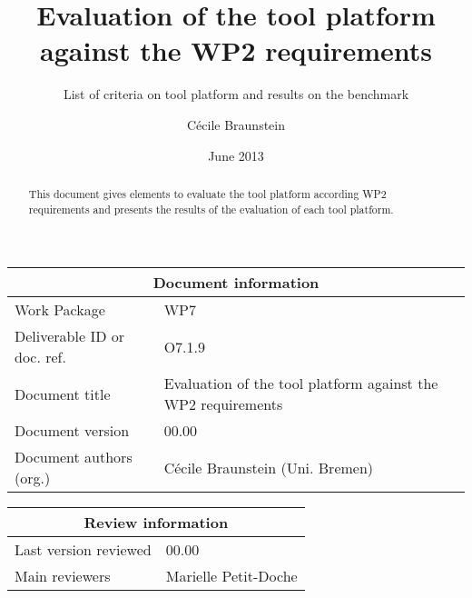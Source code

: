 \documentclass{openetcs_report}
\begin{document}
\frontmatter
{}




\title{Evaluation of the tool platform against the WP2 requirements }

\subtitle{List of criteria on tool platform and results on the benchmark}

\date{June 2013}


\author{C\'ecile Braunstein}

 


\begin{abstract}
This document gives elements to evaluate the tool platform according
WP2 requirements and presents the results of the evaluation of each
tool platform.
\end{abstract}

\maketitle
\tableofcontents
\listoffiguresandtables
\newpage


\begin{tabular}{|p{4.4cm}|p{8.7cm}|}
\hline
\multicolumn{2}{|c|}{Document information} \\
\hline
Work Package &  WP7  \\
Deliverable ID or doc. ref. & O7.1.9\\
\hline
Document title & Evaluation of the tool platform against the WP2 requirements \\
Document version & 00.00 \\
Document authors (org.)  & C\'ecile Braunstein (Uni. Bremen)  \\
\hline
\end{tabular}

\begin{tabular}{|p{4.4cm}|p{8.7cm}|}
\hline
\multicolumn{2}{|c|}{Review information} \\
\hline
Last version reviewed & 00.00 \\
\hline
Main reviewers & Marielle Petit-Doche\\
 \hline
\end{tabular}
\end{document}
